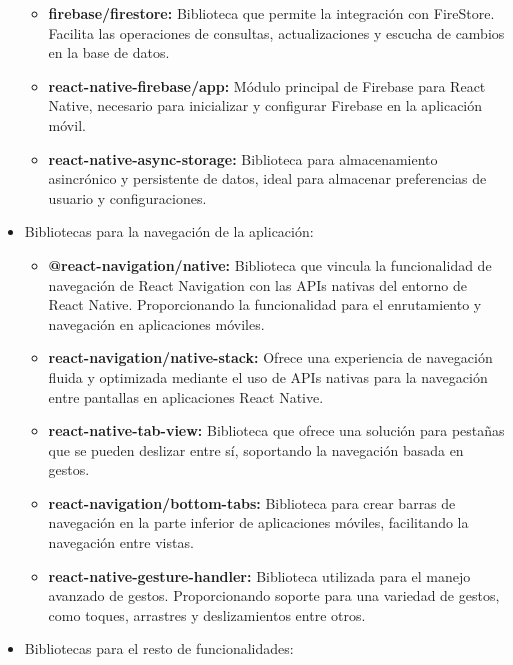 \begin{itemize}
\begin{itemize}
\item \textbf{firebase/firestore:} Biblioteca que permite la integración con FireStore. Facilita las operaciones de consultas, actualizaciones y escucha de cambios en la base de datos.

\item \textbf{react-native-firebase/app:} Módulo principal de Firebase para React Native, necesario para inicializar y configurar Firebase en la aplicación móvil.

\item \textbf{react-native-async-storage:} Biblioteca para almacenamiento asincrónico y persistente de datos, ideal para almacenar preferencias de usuario y configuraciones.

\end{itemize}


\item Bibliotecas para la navegación de la aplicación:

\begin{itemize}

\item \textbf{@react-navigation/native:} Biblioteca que vincula la funcionalidad de navegación de React Navigation con las APIs nativas del entorno de React Native.
Proporcionando la funcionalidad para el enrutamiento y navegación en aplicaciones móviles. 

\item \textbf{react-navigation/native-stack:} Ofrece una experiencia de navegación fluida y optimizada mediante el uso de APIs nativas para la navegación entre pantallas en aplicaciones React Native.

\item \textbf{react-native-tab-view:} Biblioteca que ofrece una solución para pestañas que se pueden deslizar entre sí, soportando la navegación basada en gestos.

\item \textbf{react-navigation/bottom-tabs:} Biblioteca para crear barras de navegación en la parte inferior de aplicaciones móviles, facilitando la navegación entre vistas.

\item \textbf{react-native-gesture-handler:} Biblioteca utilizada para el manejo avanzado de gestos. Proporcionando soporte para una variedad de gestos, como toques, arrastres y deslizamientos entre otros.

\end{itemize}


\item Bibliotecas para el resto de funcionalidades:


\end{itemize}
